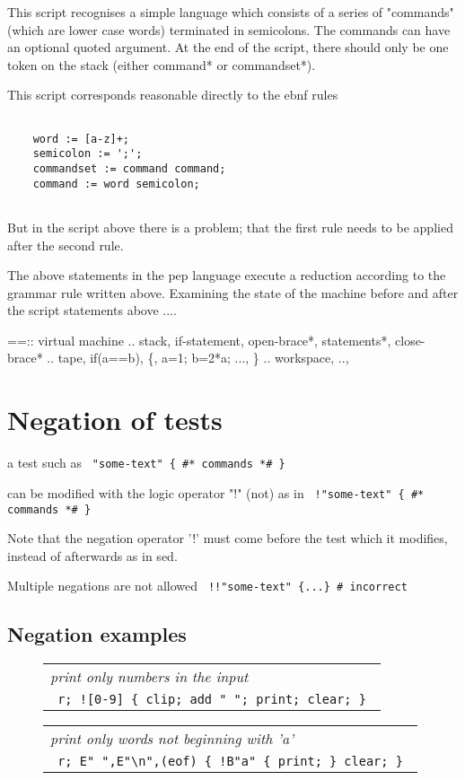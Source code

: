 \documentclass[a4paper,12pt]{article}
\begin{document}
  
  This script recognises a simple language which consists of a series of
  "commands" (which are lower case words) terminated in semicolons. The
  commands can have an optional quoted argument. At the end of the script,
  there should only be one token on the stack (either command* or commandset*).

  This script corresponds reasonable directly to the ebnf rules 
 \begin{lstlisting}[breaklines] 

    word := [a-z]+;
    semicolon := ';';
    commandset := command command;
    command := word semicolon;
  
 \end{lstlisting} 


  But in the script above there is a problem; that the first rule
  needs to be applied after the second rule.

  The above statements in the pep language execute a reduction according to
  the grammar rule written above. Examining the state of the machine
  before and after the script statements above ....
  
  ==:: virtual machine
  .. stack, if-statement, open-brace*, statements*, close-brace*
  .. tape, if(a==b), \{, a=1; b=2*a; ..., \}
  .. workspace,
  ..,

\section{Negation of tests}

 a test such as 
 \verb| "some-text" { #* commands *# } |


 can be modified with the logic operator "!" (not) as in 
 \verb| !"some-text" { #* commands *# } |


 Note that the negation operator '!' must come before the test which it
 modifies, instead of afterwards as in sed.

 Multiple negations are not allowed 
 \verb| !!"some-text" {...} # incorrect |

  
\subsection{Negation examples}
 \begin{figure}
 \begin{tabular}{ l }
 \emph{ print only numbers in the input  } \\ 
 \verb| r; ![0-9] { clip; add " "; print; clear; } |
 \end{tabular} 
 \end{figure}
 \begin{figure}
 \begin{tabular}{ l }
 \emph{ print only words not beginning with 'a' } \\ 
 \verb| r; E" ",E"\n",(eof) { !B"a" { print; } clear; } |
 \end{tabular} 
 \end{figure}
\end{document}
